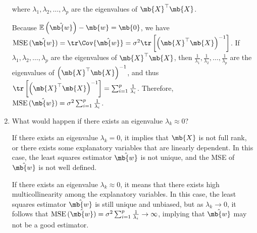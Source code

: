 \begin{exercise}[Multicollinearity]
\begin{enumerate}
            where $\lambda_1,\lambda_2,\ldots,\lambda_{p}$ are the eigenvalues of $\mb{X}^{\top} \mb{X}$.
            
            \begin{solution}
                Because $\mathbb{E}\left(\hat{\mb{w}}\right) - \mb{w} = \mb{0}$, we have $\text{MSE}\,(\hat{\mb{w}}) = \tr\Cov{\hat{\mb{w}}} = \sigma^2 \tr\left[\left(\mb{X}^{\top} \mb{X}\right)^{-1}\right]$.
                If $\lambda_1,\lambda_2,\ldots,\lambda_{p}$ are the eigenvalues of $\mb{X}^{\top} \mb{X}$, then $\frac{1}{\lambda_1},\frac{1}{\lambda_2},\ldots,\frac{1}{\lambda_{p}}$ are the eigenvalues of $\left(\mb{X}^{\top} \mb{X}\right)^{-1}$, and thus $\tr\left[\left(\mb{X}^{\top} \mb{X}\right)^{-1}\right] = \sum_{i=1}^{p} \frac{1}{\lambda_i}$. Therefore, $\text{MSE}\,(\hat{\mb{w}}) = \sigma^2 \sum_{i=1}^{p} \frac{1}{\lambda_i}$.
                \qedhere
            \end{solution}
            
            
        \item What would happen if there exists an eigenvalue $\lambda_k \approx 0$?
            
            \begin{solution}
                If there exists an eigenvalue $\lambda_k = 0$, it implies that $\mb{X}$ is not full rank, or there exists some explanatory variables that are linearly dependent. In this case, the least squares estimator $\hat{\mb{w}}$ is not unique, and the MSE of $\hat{\mb{w}}$ is not well defined.
                
                If there exists an eigenvalue $\lambda_k \approx 0$, it means that there exists high multicollinearity among the explanatory variables. In this case, the least squares estimator $\hat{\mb{w}}$ is still unique and unbiased, but as $\lambda_k \to 0$, it follows that $\text{MSE}\,(\hat{\mb{w}}) = \sigma^2 \sum_{i=1}^{p} \frac{1}{\lambda_i}\to \infty$, implying that $\hat{\mb{w}}$ may not be a good estimator.
                \qedhere
            \end{solution}
    \end{enumerate}
\end{exercise}
\newpage




